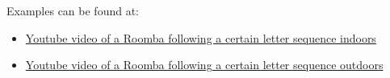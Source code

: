 \documentclass[a4paper,10pt]{book}
\begin{document}
\vspace {0.5cm}

Examples can be found at:

\begin{itemize}
  \item \href{https://youtu.be/hPpPM0kasyk}{Youtube video of a Roomba following a certain letter sequence indoors}
  \item \href{https://youtu.be/g-6yrYu4PUs}{Youtube video of a Roomba following a certain letter sequence outdoors}
\end{itemize}
\end{document}
